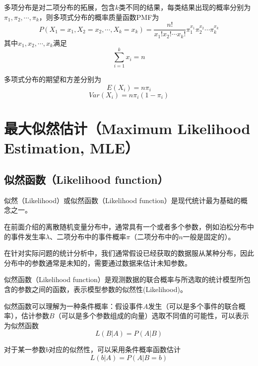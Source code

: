 多项分布是对二项分布的拓展，包含$k$类不同的结果，每类结果出现的概率分别为$\pi_1,\pi_2,\cdots,\pi_k$，则多项式分布的概率质量函数PMF为
\begin{equation}
    P(X_1 = x_1, X_2 = x_2, \cdots, X_k = x_k) = \frac{n!}{x_1!x_2!\cdots x_k!}\pi_1^{x_1}\pi_2^{x_2}\cdots\pi_k^{x_k}
\end{equation}
其中$x_1,x_2,\cdots,x_k$满足
\begin{equation}
    \sum_{i=1}^k x_i = n
\end{equation}

多项式分布的期望和方差分别为
\begin{equation}
    E(X_i) = n\pi_i
\end{equation}
\begin{equation}
    Var(X_i) = n\pi_i(1-\pi_i)
\end{equation}

\section{最大似然估计（Maximum Likelihood Estimation, MLE）}

\subsection{似然函数（Likelihood function）}

似然（Likelihood）或似然函数（Likelihood function）是现代统计最为基础的概念之一。

在前面介绍的离散随机变量分布中，通常具有一个或者多个参数，例如泊松分布中的事件发生率$\lambda$、二项分布中的事件概率$\pi$（二项分布中的$n$一般是固定的）。

在针对实际问题的统计分析中，我们通常假设已经获取的数据服从某种分布，因此分布中的参数通常是未知的，需要通过数据来估计未知参数。

似然函数（Likelihood function）是观测数据的联合概率与所选取的统计模型所包含的参数之间的函数，表示模型参数的似然性(Likelihood)。

似然函数可以理解为一种条件概率：假设事件$A$发生（可以是多个事件的联合概率），估计参数$B$（可以是多个参数组成的向量）选取不同值的可能性，可以表示为似然函数
\begin{equation}
    L(B|A) = P(A|B)
\end{equation}

对于某一参数$b$对应的似然性，可以采用条件概率函数估计
\begin{equation}
    L(b|A) = P(A|B=b)
\end{equation}

